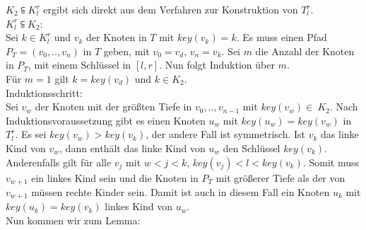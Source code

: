 \documentclass[a4paper,12pt]{article}
\begin{document}
\noindent $K_2 \subseteqq  K^r_l$ ergibt sich direkt aus dem Verfahren zur Konstruktion von $T^r_l$.\\

\noindent $ K^r_l \subseteqq K_2$:\\
Sei $k \in K^r_l$ und $v_k$ der Knoten in $T$ mit $\mathit{key}(v_k) = k$. Es muss einen Pfad $P_T = \left(v_0,..,v_n\right)$ in $T$ geben, mit $v_0 = v_d$, $v_n = v_k$. Sei $m$ die Anzahl der Knoten in $P_T$, mit einem Schlüssel in  $\left[l,r\right]$. Nun folgt Induktion über $m$.\\
Für $m = 1$ gilt $k = \mathit{key}\left(v_d\right)$  und $k \in K_2$. \\
Induktionsschritt:\\
Sei $v_w$ der Knoten mit der größten Tiefe in $ v_0,..,v_{n-1}$ mit $\mathit{key}(v_w) \in~K_2$. Nach Induktionsvoraussetzung gibt es einen Knoten $u_w$ mit $\mathit{key}(u_w) = \mathit{key}(v_w)$ in $T^r_l$.  Es sei $\mathit{key}(v_w) > \mathit{key}(v_k)$, der andere Fall ist symmetrisch. Ist $v_k$ das linke Kind von $v_w$, dann enthält das linke Kind von $u_w$ den Schlüssel $\mathit{key}(v_k)$. Anderenfalls gilt für alle $v_j$ mit $w < j < k$, $\mathit{key}(v_j) < l < \mathit{key}(v_k)$. Somit muss $v_{w+1}$ ein linkes Kind sein und die Knoten in $P_T$ mit größerer Tiefe als der von $v_{w+1}$ müssen rechte Kinder sein. Damit ist auch in diesem Fall ein Knoten $u_k$ mit $\mathit{key}(u_k) = \mathit{key}(v_k)$ linkes Kind von $u_w$.  \\

\noindent Nun kommen wir zum Lemma:\\
\end{document}
